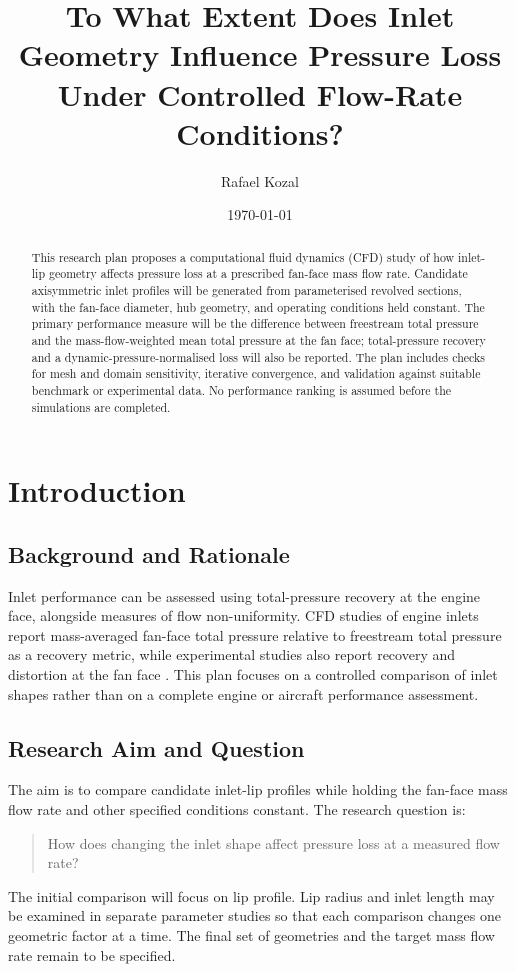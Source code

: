 \documentclass[11pt]{article}
\title{To What Extent Does Inlet Geometry Influence Pressure Loss Under Controlled Flow-Rate Conditions?}
\author{Rafael Kozal}
\date{\today}
\begin{document}
\maketitle

\begin{abstract}
This research plan proposes a computational fluid dynamics (CFD) study of how inlet-lip geometry affects pressure loss at a prescribed fan-face mass flow rate. Candidate axisymmetric inlet profiles will be generated from parameterised revolved sections, with the fan-face diameter, hub geometry, and operating conditions held constant. The primary performance measure will be the difference between freestream total pressure and the mass-flow-weighted mean total pressure at the fan face; total-pressure recovery and a dynamic-pressure-normalised loss will also be reported. The plan includes checks for mesh and domain sensitivity, iterative convergence, and validation against suitable benchmark or experimental data. No performance ranking is assumed before the simulations are completed.
\end{abstract}

\section{Introduction}


\subsection{Background and Rationale}
Inlet performance can be assessed using total-pressure recovery at the engine face, alongside measures of flow non-uniformity. CFD studies of engine inlets report mass-averaged fan-face total pressure relative to freestream total pressure as a recovery metric, while experimental studies also report recovery and distortion at the fan face \cite{slater2025,ybarra1981}. This plan focuses on a controlled comparison of inlet shapes rather than on a complete engine or aircraft performance assessment.

\subsection{Research Aim and Question}
The aim is to compare candidate inlet-lip profiles while holding the fan-face mass flow rate and other specified conditions constant. The research question is:
\begin{quote}
How does changing the inlet shape affect pressure loss at a measured flow rate?
\end{quote}
The initial comparison will focus on lip profile. Lip radius and inlet length may be examined in separate parameter studies so that each comparison changes one geometric factor at a time. The final set of geometries and the target mass flow rate remain to be specified.
\end{document}
